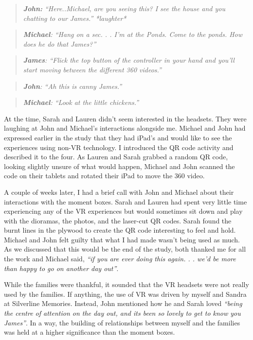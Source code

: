 \begin{quote}
\textit{    \textbf{John:} ``Here..Michael, are you seeing this? I see the house and you chatting to our James.'' *laughter*
}
\end{quote}
\begin{quote}
\textit{    \textbf{Michael}: ``Hang on a sec. . . I'm at the Ponds. Come to the ponds. How does he do that James?''
}
\end{quote}
\begin{quote}
\textit{    \textbf{James}: ``Flick the top button of the controller in your hand and you'll start moving between the different 360 videos.''
}
\end{quote}
\begin{quote}
\textit{   \textbf{ John}: ``Ah this is canny James.''
}
\end{quote}
\begin{quote}
\textit{    \textbf{Michael}: ``Look at the little chickens.''}
\end{quote}
At the time, Sarah and Lauren didn't seem interested in the headsets. They were laughing at John and Michael's interactions alongside me. Michael and John had expressed earlier in the study that they had iPad's and would like to see the experiences using non-VR technology. I introduced the QR code activity and described it to the four. As Lauren and Sarah grabbed a random QR code, looking slightly unsure of what would happen, Michael and John scanned the code on their tablets and rotated their iPad to move the 360 video.

A couple of weeks later, I had a brief call with John and Michael about their interactions with the moment boxes. Sarah and Lauren had spent very little time experiencing any of the VR experiences but would sometimes sit down and play with the dioramas, the photos, and the laser-cut QR codes. Sarah found the burnt lines in the plywood to create the QR code interesting to feel and hold. Michael and John felt guilty that what I had made wasn't being used as much. As we discussed that this would be the end of the study, both thanked me for all the work and Michael said, \textit{``if you are ever doing this again. . . we'd be more than happy to go on another day out''}.

While the families were thankful, it sounded that the VR headsets were not really used by the families. If anything, the use of VR was driven by myself and Sandra at Silverline Memories. Instead, John mentioned how he and Sarah loved \textit{``being the centre of attention on the day out, and its been so lovely to get to know you James''}. In a way, the building of relationships between myself and the families was held at a higher significance than the moment boxes.

